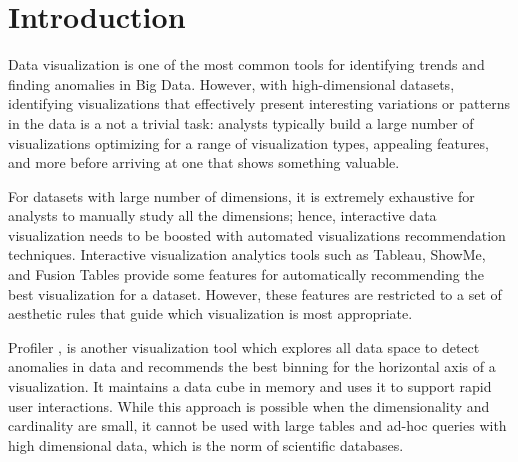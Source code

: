 \section{Introduction}
\label{sec:intro}
%
Data visualization is one of the most common tools for identifying trends and finding anomalies in Big Data. 
%
However, with high-dimensional datasets, identifying visualizations that effectively present interesting variations or patterns in the data is a not a trivial task: analysts typically build a large number of visualizations optimizing for a range of visualization types, appealing features, and more before arriving at one that shows something valuable. 
%

For datasets with large number of dimensions, it is extremely exhaustive for analysts to manually study all the dimensions; hence, interactive data visualization needs to be boosted with automated visualizations recommendation techniques.
%
Interactive visualization analytics tools such as Tableau, ShowMe, and Fusion Tables \cite{DBLP:conf/sigmod/GonzalezHJLMSSG10,DBLP:journals/tvcg/MackinlayHS07,Stolte:2000:PSQ:857190.857686} provide some features for automatically recommending the best visualization for a dataset. However, these features are restricted to a set of aesthetic rules that guide which visualization is most appropriate.
%
%
%
%
%

Profiler \cite{kandel2012profiler}, is another visualization tool which explores all data space to detect anomalies in data and recommends the best binning for the horizontal axis of a visualization. 
%
%
%
%
%
It maintains a data cube in memory and uses it to support rapid user interactions.
%
While this approach is possible when the dimensionality and cardinality are small, it cannot be used with large tables and ad-hoc queries with high dimensional data, which is the norm of scientific databases.
%

